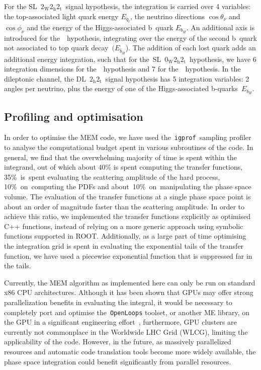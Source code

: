 For the SL~$2_{\mathrm{W}} 2_{\mathrm{h}} 2_{\mathrm{t}}$~signal hypothesis, the integration is carried over 4 variables: the top-associated light quark energy $E_{q_t}$, the neutrino directions $\cos{\theta_\nu}$ and $\cos{\phi_\nu}$ and the energy of the Higgs-associated b~quark $E_{b_H}$. An additional axis is introduced for the~\ttbb~hypothesis, integrating over the energy of the second b~quark not associated to top quark decay~$(E_{\bar{b}_H}$). The addition of each lost quark adds an additional energy integration, such that for the~SL~$0_{\mathrm{W}} 2_{\mathrm{h}} 2_{\mathrm{t}}$~hypothesis, we have 6 integration dimensions for the~\ttHbb~hypothesis and 7 for the~\ttbb~hypothesis. In the dileptonic channel, the DL~$2_{\mathrm{h}} 2_{\mathrm{t}}$~signal hypothesis has 5 integration variables: 2 angles per neutrino, plus the energy of one of the Higgs-associated b-quarks~$E_{b_H}$.

\subsection{Profiling and optimisation}
\label{sec:mem_optimisation}

In order to optimise the MEM code, we have used the~\texttt{igprof}~sampling profiler~\cite{Eulisse:2005zz,Tuura:2008zza} to analyse the computational budget spent in various subroutines of the code. In general, we find    
that the overwhelming majority of time is spent within the integrand, out of which about 40\% is spent computing the transfer functions, 35\%~is~spent evaluating the scattering amplitude of the hard process, 10\%~on~computing the PDFs and about~10\%~on~manipulating the phase space volume. The evaluation of the transfer functions at a single phase space point is about an order of magnitude faster than the scattering amplitude. In order to achieve this ratio, we implemented the transfer functions explicitly as optimised C++ functions, instead of relying on a more generic approach using symbolic functions supported in ROOT. Additionally, as a large part of time optimising the integration grid is spent in evaluating the exponential tails of the transfer function, we have used a piecewise exponential function that is suppressed far in the tails.

Currently, the MEM algorithm as implemented here can only be run on standard x86 CPU architectures. Although it has been shown that GPUs may offer strong parallelization benefits in evaluating the integral, it would be necessary to completely port and optimise the~\texttt{OpenLoops} toolset, or another ME library, on the GPU in a significant engineering effort~\cite{Schouten:2014yza}, furthermore, GPU clusters are currently not commonplace in the Worldwide LHC Grid (WLCG), limiting the applicability of the code. However, in the future, as massively parallelized resources and automatic code translation tools become more widely available, the phase space integration could benefit significantly from parallel resources.

